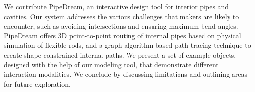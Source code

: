 We contribute PipeDream, an interactive design tool for interior pipes and cavities. Our system addresses the various challenges that makers are likely to encounter, such as avoiding intersections and ensuring maximum bend angles. PipeDream offers 3D point-to-point routing of internal pipes based on physical simulation of flexible rods, and a graph algorithm-based path tracing technique to create shape-constrained internal paths. We present a set of example objects, designed with the help of our modeling tool, that demonstrate different interaction modalities. We conclude by discussing limitations and outlining areas for future exploration. 

